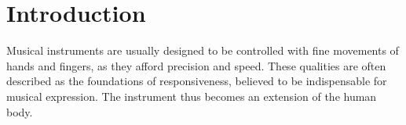 \documentclass{nime-alternate_ADJ} %
\begin{document}
%
% 
%




\printccsdesc

\section{Introduction}

Musical instruments are usually designed to be controlled with fine movements of hands and fingers, as they afford precision and speed. These qualities are often described as the foundations of responsiveness, believed to be indispensable for musical expression. The instrument thus becomes an extension of the human body. 
\end{document}
